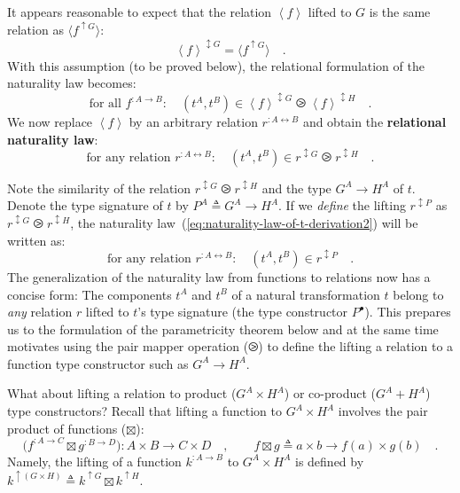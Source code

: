 It appears reasonable to expect that the relation $\left<f\right>$
lifted to $G$ is the same relation as $\langle f^{\uparrow G}\rangle$:
\[
\left<f\right>^{\updownarrow G}=\langle f^{\uparrow G}\rangle\quad.
\]
With this assumption (to be proved below), the relational formulation
of the naturality law becomes:
\[
\text{for all }f^{:A\rightarrow B}:\quad(t^{A},t^{B})\in\left<f\right>^{\updownarrow G}\ogreaterthan\left<f\right>^{\updownarrow H}\quad.
\]
We now replace $\left<f\right>$ by an arbitrary relation $r^{:A\leftrightarrow B}$
and obtain the \textbf{relational
naturality law}:
\begin{equation}
\text{for any relation }r^{:A\leftrightarrow B}:\quad(t^{A},t^{B})\in r^{\updownarrow G}\ogreaterthan r^{\updownarrow H}\quad.\label{eq:naturality-law-of-t-derivation2}
\end{equation}

Note the similarity of the relation $r^{\updownarrow G}\ogreaterthan r^{\updownarrow H}$
and the type $G^{A}\rightarrow H^{A}$ of $t$. Denote the type signature
of $t$ by $P^{A}\triangleq G^{A}\rightarrow H^{A}$. If we \emph{define}
the lifting $r^{\updownarrow P}$ as $r^{\updownarrow G}\ogreaterthan r^{\updownarrow H}$,
the naturality law~(\ref{eq:naturality-law-of-t-derivation2}) will
be written as:
\begin{equation}
\text{for any relation }r^{:A\leftrightarrow B}:\quad(t^{A},t^{B})\in r^{\updownarrow P}\quad.\label{eq:naturality-law-of-t-derivation3}
\end{equation}
The generalization of the naturality law from functions to relations
now has a concise form: The components $t^{A}$ and $t^{B}$ of a
natural transformation $t$ belong to \emph{any} relation $r$ lifted
to $t$\textsf{'}s type signature (the type constructor $P^{\bullet}$). This
prepares us to the formulation of the parametricity theorem below
and at the same time motivates using the pair mapper operation ($\ogreaterthan$)
to define the lifting a relation to a function type constructor such
as $G^{A}\rightarrow H^{A}$.

What about lifting a relation to product ($G^{A}\times H^{A}$) or
co-product ($G^{A}+H^{A}$) type constructors? Recall that lifting
a function to $G^{A}\times H^{A}$ involves the pair product of functions
($\boxtimes$):
\[
\big(f^{:A\rightarrow C}\boxtimes g^{:B\rightarrow D}\big):A\times B\rightarrow C\times D\quad,\quad\quad f\boxtimes g\triangleq a\times b\rightarrow f(a)\times g(b)\quad.
\]
Namely, the lifting of a function $k^{:A\rightarrow B}$ to $G^{A}\times H^{A}$
is defined by $k^{\uparrow(G\times H)}\triangleq k^{\uparrow G}\boxtimes k^{\uparrow H}$. 

